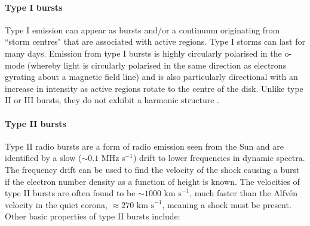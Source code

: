 \paragraph{Type I bursts}
Type I emission can appear as bursts and/or a continuum originating from ``storm centres" that are associated with active regions. Type I storms can last for many days. Emission from type I bursts is highly circularly polarised in the o-mode (whereby light is circularly polarised in the same direction as electrons gyrating about a magnetic field line) and is also particularly directional with an increase in intensity as active regions rotate to the centre of the disk. Unlike type II or III bursts, they do not exhibit a harmonic structure \citep{McLean1985}.
\paragraph{Type II bursts}
Type II radio bursts are a form of radio emission seen from the Sun and are identified by a slow ($\sim 0.1$ MHz s$^{-1}$) drift to lower frequencies in dynamic spectra. The frequency drift can be used to find the velocity of the shock causing a burst if the electron number density as a function of height is known. The velocities of type II bursts are often found to be $\sim 1000 \mbox{ km s}^{-1}$, much faster than the Alfv\'{e}n velocity in the quiet corona, $\approx 270 \mbox{ km s}^{-1}$, meaning a shock must be present. Other basic properties of type II bursts include:
